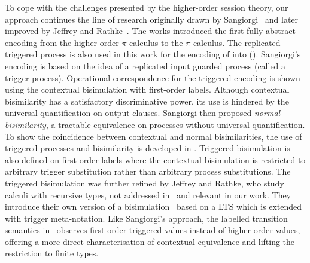 To cope with the challenges presented by the higher-order
session theory, 
our approach continues the line of research 
originally drawn by Sangiorgi~\cite{San96H,SangiorgiD:expmpa}
and later improved by Jeffrey and Rathke~\cite{DBLP:journals/lmcs/JeffreyR05}.
The works %
\cite{San96H,SangiorgiD:expmpa}
introduced the first fully abstract encoding from the higher-order 
$\pi$-calculus to the $\pi$-calculus. 
The replicated triggered process 
is also used in this work for the encoding of \HOp into \sessp ().
Sangiorgi's encoding is based on the idea of a replicated input guarded process 
(called a trigger process). Operational correspondence for
the triggered encoding is shown using the contextual bisimulation
with first-order labels.
Although contextual bisimilarity has a satisfactory discriminative power,
its use is hindered by the universal quantification on output clauses.
Sangiorgi then proposed \emph{normal bisimilarity}, a tractable  equivalence 
on processes without universal quantification. 
To show the coincidence between contextual and normal bisimilarities, 
the use of triggered processes and bisimilarity is developed in \cite{San96H}.
Triggered bisimulation is also defined on first-order labels
where the contextual bisimulation is restricted to arbitrary
trigger substitution rather than arbitrary process substitutions.
The triggered bisimulation was further refined by Jeffrey and
Rathke, who study calculi with recursive types, not addressed in~\cite{San96H,SangiorgiD:expmpa} and
relevant in our work.
They introduce their own version of a
bisimulation~\cite{DBLP:journals/lmcs/JeffreyR05}
based on a LTS which is extended with trigger meta-notation.
Like Sangiorgi's approach, the labelled transition semantics
in~\cite{JeffreyR05}
observes first-order triggered values instead of
higher-order values, offering a more direct characterisation of contextual equivalence
and lifting the restriction to finite types.


